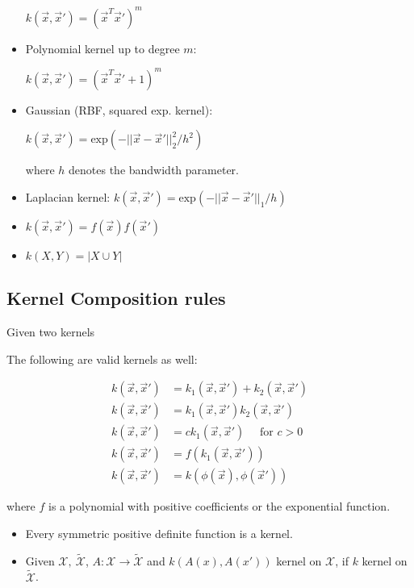 \documentclass[8pt,a4paper]{scrartcl}
\begin{document}
\begin{multicols*}{3}
\begin{itemize}
$k(\vec{x},\vec{x}')=(\vec{x}^T\vec{x}')^m$
\item Polynomial kernel up to degree $m$: 

$k(\vec{x},\vec{x}') = (\vec{x}^T\vec{x}'+1)^m$
\item Gaussian (RBF, squared exp. kernel):

$k(\vec{x},\vec{x}')=\text{exp}(-||\vec{x}-\vec{x}'||_2^2/h^2)$

where $h$ denotes the bandwidth parameter.
\item Laplacian kernel: $k(\vec{x},\vec{x}')=\text{exp}(-||\vec{x}-\vec{x}'||_1/h)$
\item $k(\vec{x},\vec{x}')=f(\vec{x})f(\vec{x}')$
\item $k(X,Y)=|X\cup Y|$
\end{itemize}

\subsection{Kernel Composition rules}

Given two kernels 


The following are valid kernels as well:

\begin{align*}
k(\vec{x},\vec{x}')&=k_1(\vec{x},\vec{x}')+k_2(\vec{x},\vec{x}')\\
k(\vec{x},\vec{x}')&=k_1(\vec{x},\vec{x}')k_2(\vec{x},\vec{x}')\\
k(\vec{x},\vec{x}')&=ck_1(\vec{x},\vec{x}')\quad\text{ for }c>0\\
k(\vec{x},\vec{x}')&=f(k_1(\vec{x},\vec{x}'))\\
k(\vec{x},\vec{x}')&=k(\phi(\vec{x}),\phi(\vec{x}'))
\end{align*}

where $f$ is a polynomial with positive coefficients or the exponential function.

\begin{itemize}
\ncompaq
\item Every symmetric positive definite function is a kernel.
\item Given $\mathcal{X},\ \tilde{\mathcal{X}}$, $A:\mathcal{X}\rightarrow\tilde{\mathcal{X}}$ and $k(A(x),A(x'))$ kernel on $\mathcal{X}$, if $k$ kernel on $\tilde{\mathcal{X}}$.
\end{itemize}


\end{multicols*}
\end{document}
